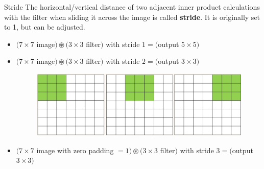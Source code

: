 \begin{frame}[allowframebreaks]

\begin{myconceptblock}{5.6}{Stride}
    The horizontal/vertical distance of two adjacent inner product calculations with the filter when sliding it across the image is called \textbf{stride}.
    It is originally set to 1, but can be adjusted.

    \begin{itemize}
        \item $(7 \times 7$ image$) \circledast(3 \times 3$ filter$)$ with stride $1=($output $5 \times 5)$
        \item
        $(7 \times 7$ image$) \circledast(3 \times 3$ filter$)$ with stride $2=($output $3 \times 3)$

        \begin{figure}[H]
            \centering
            \includegraphics[width=1.0\textwidth]{.././assets/5.5.png}
        \end{figure}
        \item $(7 \times 7$ image with zero padding $=1) \circledast(3 \times 3$ filter$)$ with stride $3=($output $3 \times 3)$
    \end{itemize}
\end{myconceptblock}

\end{frame}

